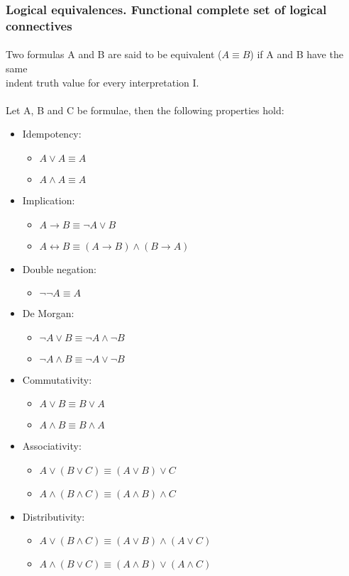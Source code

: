 \documentclass[part1.tex]{subfiles}
\begin{document}
\subsubsection{Logical equivalences. Functional complete set of logical connectives}
\paragraph{} Two formulas A and B are said to be equivalent (\(A \equiv B\)) if A and B have the same \\
indent truth value for every interpretation I.
\paragraph{} Let A, B and C be formulae, then the following
properties hold:
\begin{itemize}
\item Idempotency:
  \begin{itemize}
    \item $A \vee A \equiv A$
    \item $A \wedge A \equiv A$
  \end{itemize}
\item Implication:
  \begin{itemize}
   \item $A \rightarrow B \equiv \neg A \vee B$
   \item $A \leftrightarrow B \equiv (A \rightarrow B) \wedge (B
     \rightarrow A)$
  \end{itemize}
\item Double negation:
  \begin{itemize}
    \item $\neg\neg{A} \equiv A$
  \end{itemize}
\item De Morgan:
  \begin{itemize}
    \item $\neg{A \vee B} \equiv \neg{A} \wedge \neg{B}$
    \item $\neg{A \wedge B} \equiv \neg{A} \vee \neg{B}$
  \end{itemize}
\item Commutativity:
  \begin{itemize}
    \item $A \vee B \equiv B \vee A$
    \item $A \wedge B \equiv B \wedge A$
  \end{itemize}
\item Associativity:
  \begin{itemize}
    \item $A \vee (B \vee C) \equiv (A \vee B) \vee C$
    \item $A \wedge (B \wedge C) \equiv (A \wedge B) \wedge C$
  \end{itemize}
\item Distributivity:
  \begin{itemize}
    \item $A \vee (B \wedge C) \equiv (A \vee B) \wedge (A \vee
      C)$
    \item $A \wedge (B \vee C) \equiv (A \wedge B) \vee (A \wedge
      C)$
  \end{itemize}
\end{itemize}
\end{document}
